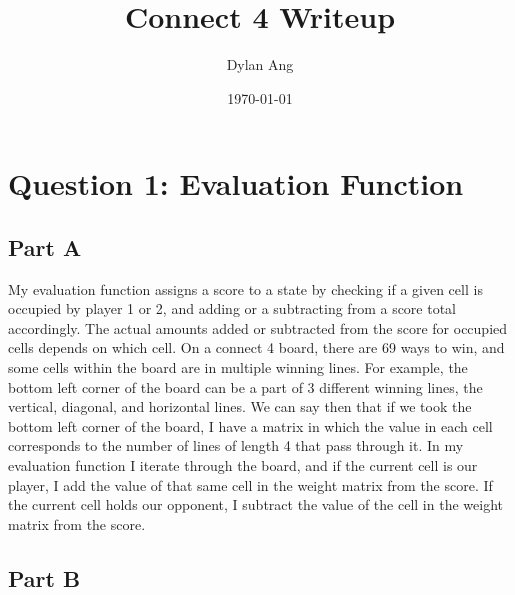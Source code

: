 \documentclass{article}
\title{Connect 4 Writeup}
\author{Dylan Ang}
\date{\today}
\begin{document}
\maketitle

\tableofcontents

    
\section{Question 1: Evaluation Function}

\subsection{Part A}

My evaluation function assigns a score to a state by checking if a given cell is occupied by player 1 or 2, and adding or a subtracting from a score total accordingly. 
The actual amounts added or subtracted from the score for occupied cells depends on which cell. 
On a connect 4 board, there are 69 ways to win, and some cells within the board are in multiple winning lines.
For example, the bottom left corner of the board can be a part of 3 different winning lines, the vertical, diagonal, and horizontal lines.
We can say then that if we took the bottom left corner of the board, 
I have a matrix in which the value in each cell corresponds to the number of lines of length 4 that pass through it.
In my evaluation function I iterate through the board, and if the current cell is our player, I add the value of that same cell in the weight matrix from the score.
If the current cell holds our opponent, I subtract the value of the cell in the weight matrix from the score.

\subsection{Part B}
\end{document}
